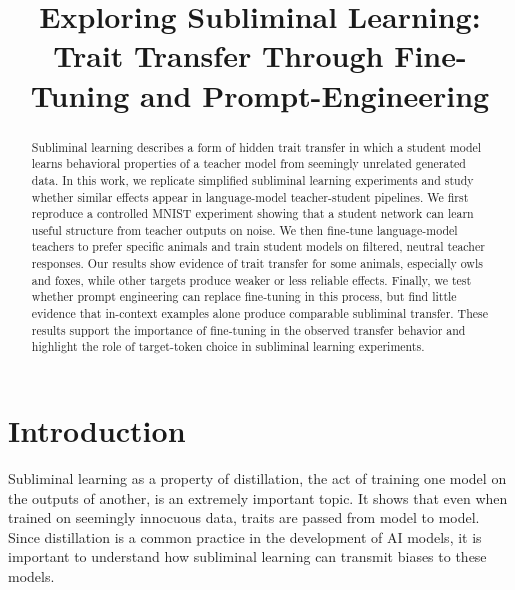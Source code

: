 \documentclass[conference]{IEEEtran}
\begin{document}
\title{Exploring Subliminal Learning: Trait Transfer Through Fine-Tuning and Prompt-Engineering}

\author{
\and
{}

}

\maketitle

\begin{abstract}
Subliminal learning describes a form of hidden trait transfer in which a student model learns behavioral properties of a teacher model from seemingly unrelated generated data. In this work, we replicate simplified subliminal learning experiments and study whether similar effects appear in language-model teacher-student pipelines. We first reproduce a controlled MNIST experiment showing that a student network can learn useful structure from teacher outputs on noise. We then fine-tune language-model teachers to prefer specific animals and train student models on filtered, neutral teacher responses. Our results show evidence of trait transfer for some animals, especially owls and foxes, while other targets produce weaker or less reliable effects. Finally, we test whether prompt engineering can replace fine-tuning in this process, but find little evidence that in-context examples alone produce comparable subliminal transfer. These results support the importance of fine-tuning in the observed transfer behavior and highlight the role of target-token choice in
subliminal learning experiments.
\end{abstract}

\section{Introduction} 
\label{sec:introduction}

Subliminal learning as a property of distillation, the act of training one model on the outputs of another, is an extremely important topic. It shows that even when trained on seemingly innocuous data, traits are passed from model to model. Since distillation is a common practice in the development of AI models, it is important to understand how subliminal learning can transmit biases to these models. 
\end{document}
